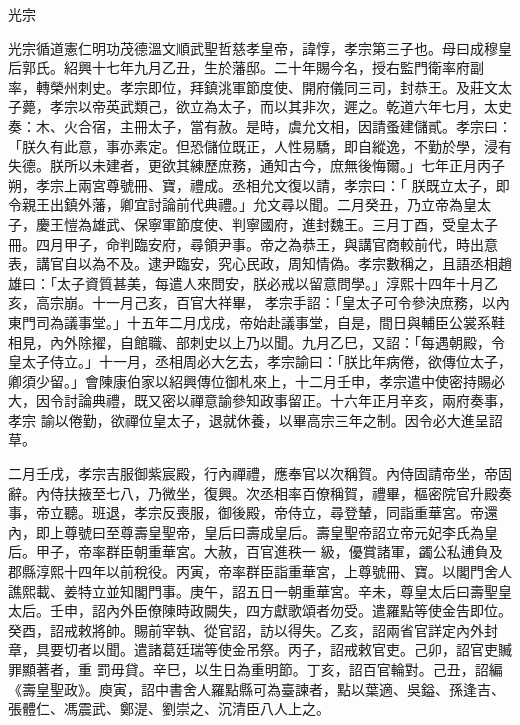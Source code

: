 
\begin{pinyinscope}

 光宗



 光宗循道憲仁明功茂德溫文順武聖哲慈孝皇帝，諱惇，孝宗第三子也。母曰成穆皇后郭氏。紹興十七年九月乙丑，生於藩邸。二十年賜今名，授右監門衛率府副
 率，轉榮州刺史。孝宗即位，拜鎮洮軍節度使、開府儀同三司，封恭王。及莊文太子薨，孝宗以帝英武類己，欲立為太子，而以其非次，遲之。乾道六年七月，太史奏：木、火合宿，主冊太子，當有赦。是時，虞允文相，因請蚤建儲貳。孝宗曰：「朕久有此意，事亦素定。但恐儲位既正，人性易驕，即自縱逸，不勤於學，浸有失德。朕所以未建者，更欲其練歷庶務，通知古今，庶無後悔爾。」七年正月丙子朔，孝宗上兩宮尊號冊、寶，禮成。丞相允文復以請，孝宗曰：「
 朕既立太子，即令親王出鎮外藩，卿宜討論前代典禮。」允文尋以聞。二月癸丑，乃立帝為皇太子，慶王愷為雄武、保寧軍節度使、判寧國府，進封魏王。三月丁酉，受皇太子冊。四月甲子，命判臨安府，尋領尹事。帝之為恭王，與講官商較前代，時出意表，講官自以為不及。逮尹臨安，究心民政，周知情偽。孝宗數稱之，且語丞相趙雄曰：「太子資質甚美，每遣人來問安，朕必戒以留意問學。」淳熙十四年十月乙亥，高宗崩。十一月己亥，百官大祥畢，
 孝宗手詔：「皇太子可令參決庶務，以內東門司為議事堂。」十五年二月戊戌，帝始赴議事堂，自是，間日與輔臣公裳系鞋相見，內外除擢，自館職、部刺史以上乃以聞。九月乙巳，又詔：「每遇朝殿，令皇太子侍立。」十一月，丞相周必大乞去，孝宗諭曰：「朕比年病倦，欲傳位太子，卿須少留。」會陳康伯家以紹興傳位御札來上，十二月壬申，孝宗遣中使密持賜必大，因令討論典禮，既又密以禪意諭參知政事留正。十六年正月辛亥，兩府奏事，孝宗
 諭以倦勤，欲禪位皇太子，退就休養，以畢高宗三年之制。因令必大進呈詔草。



 二月壬戌，孝宗吉服御紫宸殿，行內禪禮，應奉官以次稱賀。內侍固請帝坐，帝固辭。內侍扶掖至七八，乃微坐，復興。次丞相率百僚稱賀，禮畢，樞密院官升殿奏事，帝立聽。班退，孝宗反喪服，御後殿，帝侍立，尋登輦，同詣重華宮。帝還內，即上尊號曰至尊壽皇聖帝，皇后曰壽成皇后。壽皇聖帝詔立帝元妃李氏為皇后。甲子，帝率群臣朝重華宮。大赦，百官進秩一
 級，優賞諸軍，蠲公私逋負及郡縣淳熙十四年以前稅役。丙寅，帝率群臣詣重華宮，上尊號冊、寶。以閣門舍人譙熙載、姜特立並知閣門事。庚午，詔五日一朝重華宮。辛未，尊皇太后曰壽聖皇太后。壬申，詔內外臣僚陳時政闕失，四方獻歌頌者勿受。遣羅點等使金告即位。癸酉，詔戒敕將帥。賜前宰執、從官詔，訪以得失。乙亥，詔兩省官詳定內外封章，具要切者以聞。遣諸葛廷瑞等使金吊祭。丙子，詔戒敕官吏。己卯，詔官吏贓罪顯著者，重
 罰毋貸。辛巳，以生日為重明節。丁亥，詔百官輪對。己丑，詔編《壽皇聖政》。庾寅，詔中書舍人羅點縣可為臺諫者，點以葉適、吳鎰、孫逢吉、張體仁、馮震武、鄭湜、劉崇之、沉清臣八人上之。




\end{pinyinscope}
